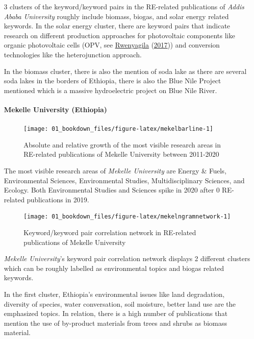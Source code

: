 \documentclass[
]{book}
\begin{document}
3 clusters of the keyword/keyword pairs in the RE-related publications of \emph{Addis Ababa University} roughly include biomass, biogas, and solar energy related keywords. In the solar energy cluster, there are keyword pairs that indicate research on different production approaches for photovoltaic components like organic photovoltaic cells (OPV, see \protect\hyperlink{ref-rwenyagila2017}{Rwenyagila} (\protect\hyperlink{ref-rwenyagila2017}{2017})) and conversion technologies like the heterojunction approach.

In the biomass cluster, there is also the mention of soda lake as there are several soda lakes in the borders of Ethiopia, there is also the Blue Nile Project mentioned which is a massive hydroelectric project on Blue Nile River.

\hypertarget{mekelle-university-ethiopia}{%
\paragraph{Mekelle University (Ethiopia)}\label{mekelle-university-ethiopia}}

\begin{figure}
\texttt{[image: 01\_bookdown\_files/figure-latex/mekelbarline-1]} \caption{Absolute and relative growth of the most visible research areas in RE-related publications of Mekelle University between 2011-2020}\label{fig:mekelbarline}
\end{figure}

The most visible research areas of \emph{Mekelle University} are Energy \& Fuels, Environmental Sciences, Environmental Studies, Multidisciplinary Sciences, and Ecology.
Both Environmental Studies and Sciences spike in 2020 after 0 RE-related publications in 2019.

\begin{figure}
\texttt{[image: 01\_bookdown\_files/figure-latex/mekelngramnetwork-1]} \caption{Keyword/keyword pair correlation network in RE-related publications of Mekelle University}\label{fig:mekelngramnetwork}
\end{figure}

\emph{Mekelle University}'s keyword pair correlation network displays 2 different clusters which can be roughly labelled as environmental topics and biogas related keywords.

In the first cluster, Ethiopia's environmental issues like land degradation, diversity of species, water conversation, soil moisture, better land use are the emphasized topics. In relation, there is a high number of publications that mention the use of by-product materials from trees and shrubs as biomass material.
\end{document}
